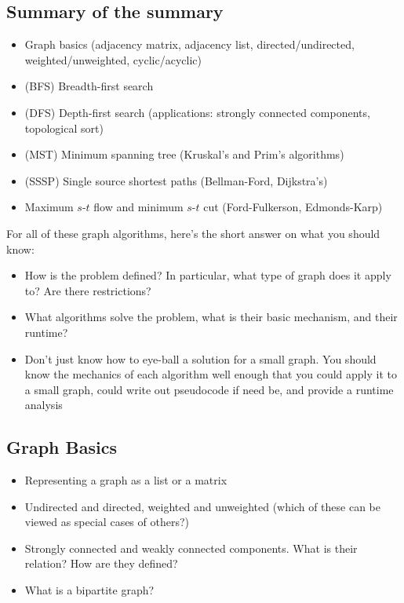 \documentclass[11  pt]{exam}
\begin{document}
	\subsection{Summary of the summary}
	\begin{itemize}
		\item Graph basics (adjacency matrix, adjacency list, directed/undirected, weighted/unweighted, cyclic/acyclic)
		\item (BFS) Breadth-first search
		\item (DFS) Depth-first search (applications: strongly connected components, topological sort)
		\item (MST) Minimum spanning tree (Kruskal's and Prim's algorithms)
		\item (SSSP) Single source shortest paths (Bellman-Ford, Dijkstra's)
		\item Maximum $s$-$t$ flow and minimum $s$-$t$ cut (Ford-Fulkerson, Edmonds-Karp)
	\end{itemize}

For all of these graph algorithms, here's the short answer on what you should know:

\begin{itemize}
	\item How is the problem defined? In particular, what type of graph does it apply to? Are there restrictions?
	\item What algorithms solve the problem, what is their basic mechanism, and their runtime?
	\item Don't just know how to eye-ball a solution for a small graph. You should know the mechanics of each algorithm well enough that you could apply it to a small graph, could write out pseudocode if need be, and provide a runtime analysis 
\end{itemize}
	
\subsection{Graph Basics}
	
	\begin{itemize}
		\item Representing a graph as a list or a matrix
		\item Undirected and directed, weighted and unweighted (which of these can be viewed as special cases of others?)
		\item Strongly connected and weakly connected components. What is their relation? How are they defined?
		\item What is a bipartite graph?
	\end{itemize}
\end{document}
